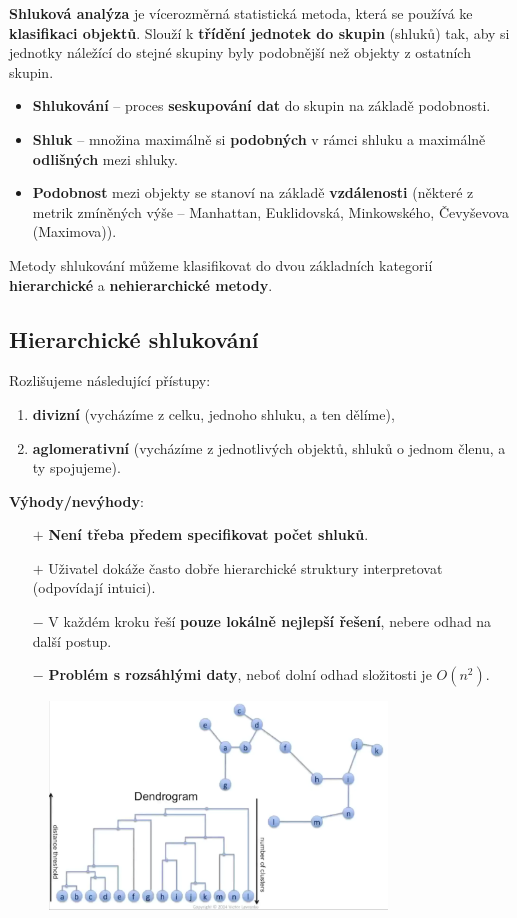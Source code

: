 \textbf{Shluková analýza} je vícerozměrná statistická metoda, která se používá ke \textbf{klasifikaci objektů}. Slouží k \textbf{třídění jednotek do skupin} (shluků) tak, aby si jednotky náležící do stejné skupiny byly podobnější než objekty z ostatních skupin.
\begin{itemize}
\item \textbf{Shlukování} -- proces \textbf{seskupování dat} do skupin na základě podobnosti.
\item \textbf{Shluk} -- množina maximálně si \textbf{podobných} v rámci shluku a maximálně \textbf{odlišných} mezi shluky.
\item \textbf{Podobnost} mezi objekty se stanoví na základě \textbf{vzdálenosti} (některé z metrik zmíněných výše -- Manhattan, Euklidovská, Minkowského, Čevyševova (Maximova)).
\end{itemize}

Metody shlukování můžeme klasifikovat do dvou základních kategorií \textbf{hierarchické} a \textbf{nehierarchické metody}.

\subsection{Hierarchické shlukování}
Rozlišujeme následující přístupy:
\begin{enumerate}
\item \textbf{divizní} (vycházíme z celku, jednoho shluku, a ten dělíme),
\item \textbf{aglomerativní} (vycházíme z jednotlivých objektů, shluků o jednom členu, a ty spojujeme).
\end{enumerate}

\noindent \textbf{Výhody/nevýhody}:
\begin{itemize}
\item[$+$] \textbf{Není třeba předem specifikovat počet shluků}.
\item[$+$] Uživatel dokáže často dobře hierarchické struktury interpretovat (odpovídají intuici).
\item[$-$] V každém kroku řeší \textbf{pouze lokálně nejlepší řešení}, nebere odhad na další postup.
\item[$-$] \textbf{Problém s rozsáhlými daty}, neboť dolní odhad složitosti je $O(n^2)$.
\end{itemize}

\begin{figure}[H]
\centering
\includegraphics[width=0.8\textwidth]{assets/10_clustering}
\end{figure}

